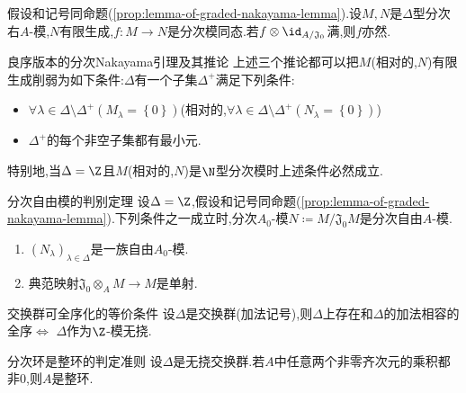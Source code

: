 \begin{corollary}{}{}
	假设和记号同命题(\cref{prop:lemma-of-graded-nakayama-lemma}).设$M,N$是$\Delta$型分次右$A$-模,$N$有限生成,$f:M\to N$是分次模同态.若$f\otimes\id_{A/\mathfrak{J}_{0}}$满,则$f$亦然.
\end{corollary}

\begin{remark}{良序版本的分次Nakayama引理及其推论}{}
	上述三个推论都可以把$M$(相对的,$N$)有限生成削弱为如下条件:$\Delta$有一个子集$\Delta^{+}$满足下列条件:
	\begin{itemize}
		\item $\forall\lambda\in\Delta\setminus\Delta^{+}\left(M_{\lambda}=\left\{0\right\}\right)$(相对的,$\forall\lambda\in\Delta\setminus\Delta^{+}\left(N_{\lambda}=\left\{0\right\}\right)$)
		\item $\Delta^{+}$的每个非空子集都有最小元.
	\end{itemize}
	特别地,当$\Delta=\Z$且$M$(相对的,$N$)是$\N$型分次模时上述条件必然成立.
\end{remark}

\begin{proposition}{分次自由模的判别定理}{}
	设$\Delta=\Z$,假设和记号同命题(\cref{prop:lemma-of-graded-nakayama-lemma}).下列条件之一成立时,分次$A_{0}$-模$N\coloneq M/\mathfrak{J}_{0}M$是分次自由$A$-模.
	\begin{enumerate}
		\item $\left(N_{\lambda}\right)_{\lambda\in\Delta}$是一族自由$A_{0}$-模.
		\item 典范映射$\mathfrak{J}_{0}\otimes_{A}M\to M$是单射.
	\end{enumerate}
\end{proposition}

\begin{lemma}{交换群可全序化的等价条件}{}
	设$\Delta$是交换群(加法记号),则$\Delta$上存在和$\Delta$的加法相容的全序$\iff$ $\Delta$作为$\Z$-模无挠.
\end{lemma}

\begin{proposition}{分次环是整环的判定准则}{}
	设$\Delta$是无挠交换群.若$A$中任意两个非零齐次元的乘积都非$0$,则$A$是整环.
\end{proposition}

















































